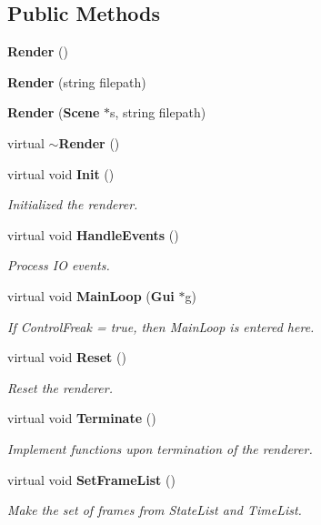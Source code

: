 \subsection*{Public Methods}
\begin{CompactItemize}
\item 
{\bf Render} ()
\item 
{\bf Render} (string filepath)
\item 
{\bf Render} ({\bf Scene} $\ast$s, string filepath)
\item 
virtual {\bf $\sim$Render} ()
\item 
virtual void {\bf Init} ()
\begin{CompactList}\small\item\em Initialized the renderer.\item\end{CompactList}\item 
virtual void {\bf Handle\-Events} ()
\begin{CompactList}\small\item\em Process IO events.\item\end{CompactList}\item 
virtual void {\bf Main\-Loop} ({\bf Gui} $\ast$g)
\begin{CompactList}\small\item\em If Control\-Freak = true, then Main\-Loop is entered here.\item\end{CompactList}\item 
virtual void {\bf Reset} ()
\begin{CompactList}\small\item\em Reset the renderer.\item\end{CompactList}\item 
virtual void {\bf Terminate} ()
\begin{CompactList}\small\item\em Implement functions upon termination of the renderer.\item\end{CompactList}\item 
virtual void {\bf Set\-Frame\-List} ()
\begin{CompactList}\small\item\em Make the set of frames from State\-List and Time\-List.\item\end{CompactList}\item 

\end{CompactItemize}
